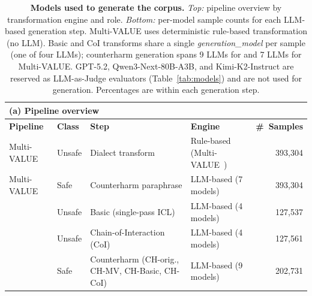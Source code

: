 \begin{table}[t]
\centering
\scriptsize
\setlength{\tabcolsep}{3.5pt}
\caption{\textbf{Models used to generate the \dataset{} corpus.} \textit{Top:} pipeline overview by transformation engine and role. \textit{Bottom:} per-model sample counts for each LLM-based generation step. Multi-VALUE uses deterministic rule-based transformation (no LLM). \dllm{} Basic and CoI transforms share a single \textit{generation\_model} per sample (one of four LLMs); counterharm generation spans 9 LLMs for \dllm{} and 7 LLMs for Multi-VALUE. GPT-5.2, Qwen3-Next-80B-A3B, and Kimi-K2-Instruct are reserved as LLM-as-Judge evaluators (Table~\ref{tab:models}) and are not used for generation. Percentages are within each generation step.}
\label{tab:generation_models}
\begin{tabular}{llllr}
\toprule
\multicolumn{5}{l}{\textbf{(a) Pipeline overview}} \\
\midrule
\textbf{Pipeline} & \textbf{Class} & \textbf{Step} & \textbf{Engine} & \textbf{\#~Samples} \\
\midrule
Multi-VALUE & Unsafe & Dialect transform     & Rule-based (Multi-VALUE~\cite{ziems-etal-2023-multi}) & 393,304 \\
Multi-VALUE & Safe   & Counterharm paraphrase & LLM-based (7 models)                                & 393,304 \\
\dllm{}     & Unsafe & Basic (single-pass ICL) & LLM-based (4 models)                               & 127,537 \\
\dllm{}     & Unsafe & Chain-of-Interaction (CoI) & LLM-based (4 models)                            & 127,561 \\
\dllm{}     & Safe   & Counterharm (CH-orig., CH-MV, CH-Basic, CH-CoI) & LLM-based (9 models)       & 202,731 \\
\bottomrule
\end{tabular}

\vspace{6pt}


\end{table}
